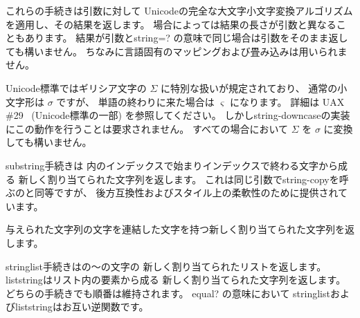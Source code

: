 \begin{entry}{%
}


これらの手続きは引数に対して
Unicodeの完全な大文字小文字変換アルゴリズム
を適用し、その結果を返します。
場合によっては結果の長さが引数と異なることもあります。
結果が引数と{\cf string=?} の意味で同じ場合は引数をそのまま返しても構いません。
ちなみに言語固有のマッピングおよび畳み込みは用いられません。

Unicode標準ではギリシア文字の $\Sigma$ に特別な扱いが規定されており、
通常の小文字形は $\sigma$ ですが、
単語の終わりに来た場合は $\varsigma$ になります。
詳細は UAX \#29~\cite{uax29} (Unicode標準の一部) を参照してください。
しかし{\cf string-downcase}の実装にこの動作を行うことは要求されません。
すべての場合において $\Sigma$ を $\sigma$ に変換しても構いません。

\end{entry}


\begin{entry}{%
}

{\cf substring}手続きは
内のインデックスで始まりインデックスで終わる文字から成る
新しく割り当てられた文字列を返します。
これは同じ引数で{\cf string-copy}を呼ぶのと同等ですが、
後方互換性およびスタイル上の柔軟性のために提供されています。
\end{entry}


\begin{entry}{%
}

与えられた文字列の文字を連結した文字を持つ新しく割り当てられた文字列を返します。

\end{entry}


\begin{entry}{%
}

{\cf string\coerce{}list}手続きはの〜の文字の
新しく割り当てられたリストを返します。
{\cf list\coerce{}string}はリスト内の要素から成る
新しく割り当てられた文字列を返します。
どちらの手続きでも順番は維持されます。
{\cf equal?} の意味において
{\cf string\coerce{}list}および{\cf list\coerce{}string}はお互い逆関数です。

\end{entry}



